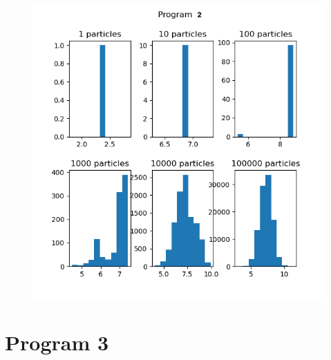 \documentclass[12pt]{article}%
\theoremstyle{definition}
\begin{document}
		
		\begin{figure}[h]
		\centering
		\includegraphics[scale=0.8]{program2_hist}
		\end{figure}
			
			
			\newpage
			
			
			\section{Program 3}
	
\end{document}
